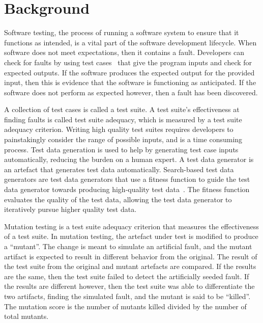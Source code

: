 \section{Background}\label{sec:background}


Software testing, the process of running a software system to ensure that it functions as intended, is a vital part
of the software development lifecycle. When software does not meet expectations, then it contains a fault.  Developers
can check for faults by using test cases~\cite{ammann2008} that give the program inputs and check for expected outputs.
If the software produces the expected output for the provided input, then this is evidence that the software is
functioning as anticipated.  If the software does not perform as expected however, then a fault has been discovered.


A collection of test cases is called a test suite. A test suite's effectiveness at finding faults is called test suite
adequacy, which is measured by a test suite adequacy criterion.  Writing high quality test suites requires developers to
painstakingly consider the range of possible inputs, and is a time consuming process. Test data generation is used to
help by generating test case inputs automatically, reducing the burden on a human expert. A test data generator is an
artefact that generates test data automatically.  Search-based test data generators are test data generators that use a
fitness function to guide the test data generator towards producing high-quality test data~\cite{STVR:STVR294}. The
fitness function evaluates the quality of the test data, allowing the test data generator to iteratively pursue higher
quality test data.


Mutation testing is a test suite adequacy criterion that measures the effectiveness of a test suite. In mutation
testing, the artefact under test is modified to produce a ``mutant''. The change is meant to simulate an artificial
fault, and the mutant artifact is expected to result in different behavior from the original. The result of the test
suite from the original and mutant artefacts are compared. If the results are the same, then the test suite failed to
detect the artificially seeded fault. If the results are different however, then the test suite was able to
differentiate the two artifacts, finding the simulated fault, and the mutant is said to be ``killed''.  The mutation
score is the number of mutants killed divided by the number of total mutants.

